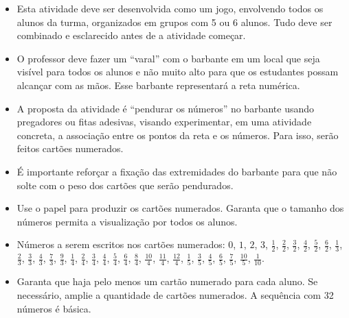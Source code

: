 \begin{objetivos}[label=chap3-ativ11]{}{}
\begin{itemize} %
  \item     Esta atividade deve ser desenvolvida como um jogo, envolvendo todos os alunos da turma, organizados em grupos com 5 ou 6 alunos. Tudo deve ser combinado e esclarecido antes de a atividade começar.
  \item  O professor deve fazer um  ``varal'' com o barbante em um local que seja visível para todos os alunos e não muito alto para que os estudantes possam alcançar com as mãos. Esse barbante representará a reta numérica.
  \item A proposta da atividade é ``pendurar os números'' no barbante usando pregadores ou fitas adesivas, visando experimentar, em uma atividade concreta, a associação entre os pontos da reta e os números. Para isso, serão feitos cartões numerados.
  \item É importante reforçar a fixação das extremidades do barbante para que não solte com o peso dos cartões que serão pendurados.
  \item Use o papel para produzir os cartões numerados. Garanta que o tamanho dos números permita a visualização por todos os alunos. 
  \item  Números a serem escritos nos cartões numerados: $0$, $1$, $2$, $3$, $\frac{1}{2}$, $\frac{2}{2}$, $\frac{3}{2}$, $\frac{4}{2}$, $\frac{5}{2}$, $\frac{6}{2}$, $\frac{1}{3}$, $\frac{2}{3}$, $\frac{3}{3}$, $\frac{4}{3}$, $\frac{7}{3}$, $\frac{9}{3}$, $\frac{1}{4}$, $\frac{2}{4}$, $\frac{3}{4}$, $\frac{4}{4}$, $\frac{5}{4}$, $\frac{6}{4}$, $\frac{8}{4}$, $\frac{10}{4}$, $\frac{11}{4}$, $\frac{12}{4}$, $\frac{1}{5}$, $\frac{3}{5}$, $\frac{4}{5}$, $\frac{6}{5}$, $\frac{7}{5}$, $\frac{10}{5}$, $\frac{1}{10}$.
  \item Garanta que haja pelo menos um cartão numerado para cada aluno. Se necessário, amplie a quantidade de cartões numerados. A sequência com 32 números é básica. 
\end{itemize} %
\end{objetivos}


